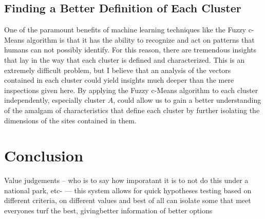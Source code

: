 \documentclass[letterpaper, 12pt]{article}
\begin{document}
\subsection{Finding a Better Definition of Each Cluster}
One of the paramount benefits of machine learning techniques like the Fuzzy c-Means algorithm is that it has the ability to recognize and act on patterns that humans can not possibly identify. For this reason, there are tremendous insights that lay in the way that each cluster is defined and characterized. 
This is an extremely difficult problem, but I believe that an analysis of the vectors contained in each cluster could yield insights much deeper than the mere inspections given here. By applying the Fuzzy c-Means algorithm to each cluster independently, especially cluster $A$, could allow us to gain a better understanding of the amalgam of characteristics that define each cluster by further isolating the dimensions of the sites contained in them. 

\section{Conclusion}

Value judgements -- who is to say how imporatant it is to not do this under a national park, etc- --- this system allows for quick hypotheses testing based on different criteria, on different values and best of all can isolate some that meet everyones turf the best, givingbetter information of better options 
 
\end{document}
